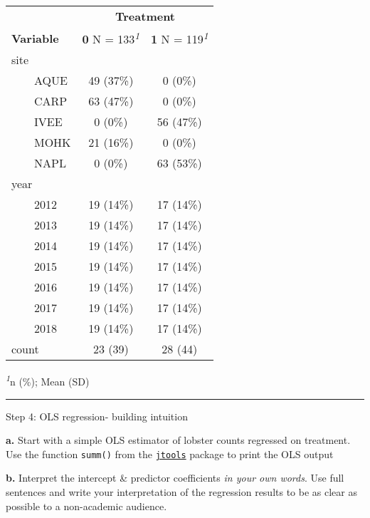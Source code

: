 \documentclass[
]{article}
\begin{document}
\begin{table}[!t]
\fontsize{12.0pt}{14.4pt}\selectfont
\begin{tabular*}{\linewidth}{@{\extracolsep{\fill}}lcc}
\toprule
 & \multicolumn{2}{c}{\textbf{Treatment}} \\ 
\cmidrule(lr){2-3}
\textbf{Variable} & \textbf{0}  N = 133\textsuperscript{\textit{1}} & \textbf{1}  N = 119\textsuperscript{\textit{1}} \\ 
\midrule\addlinespace[2.5pt]
site &  &  \\ 
    AQUE & 49 (37\%) & 0 (0\%) \\ 
    CARP & 63 (47\%) & 0 (0\%) \\ 
    IVEE & 0 (0\%) & 56 (47\%) \\ 
    MOHK & 21 (16\%) & 0 (0\%) \\ 
    NAPL & 0 (0\%) & 63 (53\%) \\ 
year &  &  \\ 
    2012 & 19 (14\%) & 17 (14\%) \\ 
    2013 & 19 (14\%) & 17 (14\%) \\ 
    2014 & 19 (14\%) & 17 (14\%) \\ 
    2015 & 19 (14\%) & 17 (14\%) \\ 
    2016 & 19 (14\%) & 17 (14\%) \\ 
    2017 & 19 (14\%) & 17 (14\%) \\ 
    2018 & 19 (14\%) & 17 (14\%) \\ 
count & 23 (39) & 28 (44) \\ 
\bottomrule
\end{tabular*}
\begin{minipage}{\linewidth}
\textsuperscript{\textit{1}}n (\%); Mean (SD)\\
\end{minipage}
\end{table}

\begin{center}\rule{0.5\linewidth}{0.5pt}\end{center}

Step 4: OLS regression- building intuition

\textbf{a.} Start with a simple OLS estimator of lobster counts
regressed on treatment. Use the function \texttt{summ()} from the
\href{https://jtools.jacob-long.com/}{\texttt{jtools}} package to print
the OLS output

\textbf{b.} Interpret the intercept \& predictor coefficients \emph{in
your own words}. Use full sentences and write your interpretation of the
regression results to be as clear as possible to a non-academic
audience.
\end{document}
